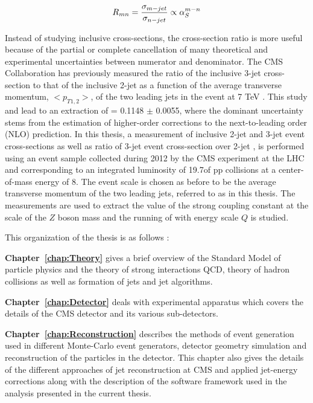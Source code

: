 \begin{equation}
R_{mn} = \frac{\sigma_{m-jet}}{\sigma_{n-jet}} \propto \alps^{m-n}
\label{eq:ratio_mn}
\end{equation}

Instead of studying inclusive cross-sections, the cross-section ratio is more useful because of the partial or complete cancellation of many theoretical and experimental uncertainties between numerator and denominator. The CMS Collaboration has previously measured the ratio of the inclusive 3-jet cross-section to that of the inclusive 2-jet as a function of the average transverse momentum, $<p_{T1,2}>$, of the two leading jets in the event at 7 TeV \cite {Chatrchyan:2013txa}. This study  and lead to an extraction of \alpsmz = 0.1148 $\pm$ 0.0055, where the dominant uncertainty stems from the estimation of higher-order corrections to the next-to-leading order (NLO) prediction. In this thesis, a measurement of inclusive 2-jet and 3-jet event cross-sections as well as ratio of 3-jet event cross-section over 2-jet \rations, is performed using an event sample collected during 2012 by the CMS experiment at the LHC and corresponding to an integrated luminosity of 19.7\fbinv of pp collisions at a center-of-mass energy of 8\TeV. The event scale is chosen as before to be the average transverse momentum of the two leading jets, referred to as \httwo in this thesis. The measurements are used to extract the value of the strong coupling constant at the scale of the $Z$ boson mass \alpsmz and the running of \alps with energy scale $Q$ is studied.

This organization of the thesis is as follows :

{\bf Chapter~\ref{chap:Theory}} gives a brief overview of the Standard Model of particle physics and the theory of strong interactions QCD, theory of hadron collisions as well as formation of jets and jet algorithms. 

{\bf Chapter~\ref{chap:Detector}} deals with experimental apparatus which covers the details of the CMS detector and its various sub-detectors.

{\bf Chapter~\ref{chap:Reconstruction}} describes the methods of event generation used in different Monte-Carlo event generators, detector geometry simulation and reconstruction of the particles in the detector. This chapter also gives the details of the different approaches of jet reconstruction at CMS and applied jet-energy corrections along with the description of the software framework used in the analysis presented in the current thesis.

